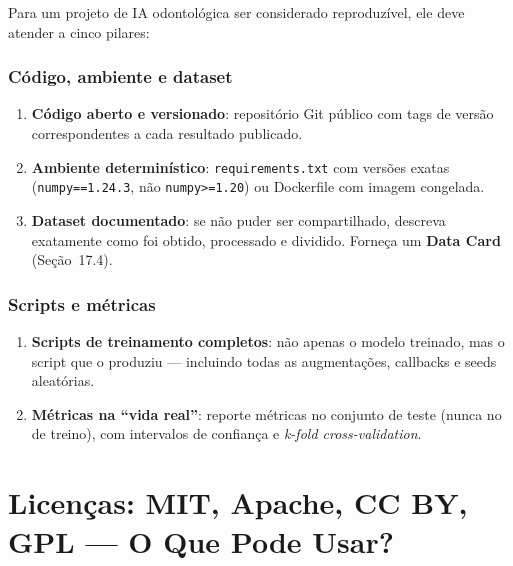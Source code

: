 Para um projeto de IA odontológica ser considerado reproduzível, ele
deve atender a cinco pilares:

\subsubsection{Código, ambiente e dataset}

\begin{enumerate}
  \item \textbf{Código aberto e versionado}: repositório Git público com
    tags de versão correspondentes a cada resultado publicado.

  \item \textbf{Ambiente determinístico}: \texttt{requirements.txt} com
    versões exatas (\texttt{numpy==1.24.3}, não \texttt{numpy>=1.20}) ou
    Dockerfile com imagem congelada.

  \item \textbf{Dataset documentado}: se não puder ser compartilhado,
    descreva exatamente como foi obtido, processado e dividido. Forneça
    um \textbf{Data Card} (Seção~17.4).
\end{enumerate}

\subsubsection{Scripts e métricas}

\begin{enumerate}
  \item \textbf{Scripts de treinamento completos}: não apenas o modelo
    treinado, mas o script que o produziu — incluindo todas as
    augmentações, callbacks e seeds aleatórias.

  \item \textbf{Métricas na ``vida real''}: reporte métricas no conjunto
    de teste (nunca no de treino), com intervalos de confiança e
    \textit{k-fold cross-validation}.
\end{enumerate}


\section{Licenças: MIT, Apache, CC BY, GPL — O Que Pode Usar?}

